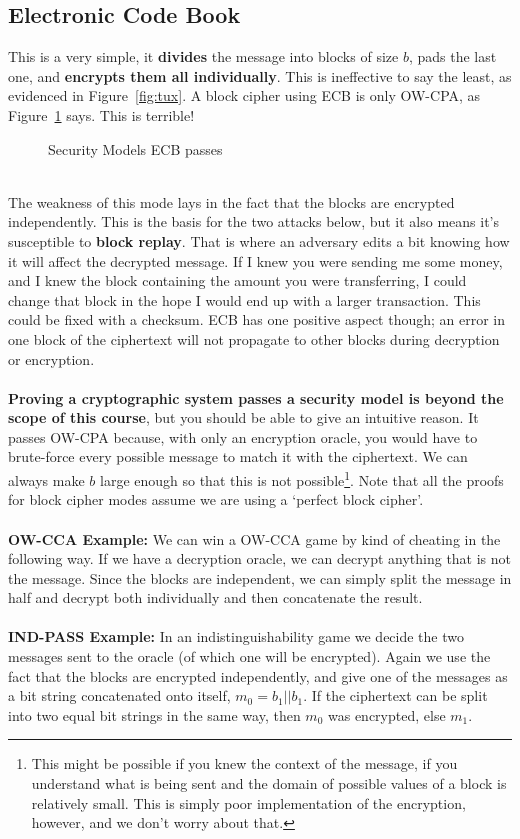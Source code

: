     \subsection{Electronic Code Book}
    This is a very simple, it \textbf{divides} the message into blocks of size $b$, pads the last one, and \textbf{encrypts them all individually}. This is ineffective to say the least, as evidenced in Figure~\ref{fig:tux}. A block cipher using ECB is only OW-CPA, as Figure~\ref{fig:ecb-attacktable} says. 
    This is terrible!\\
    \begin{figure}[htp!]
    \centering
    \caption{Security Models ECB passes}
    \label{fig:ecb-attacktable}
    \end{figure}
    \\
    The weakness of this mode lays in the fact that the blocks are encrypted independently. This is the basis for the two attacks below, but it also means it's susceptible to \textbf{block replay}. That is where an adversary edits a bit knowing how it will affect the decrypted message. If I knew you were sending me some money, and I knew the block containing the amount you were transferring, I could change that block in the hope I would end up with a larger transaction. This could be fixed with a checksum. ECB has one positive aspect though; an error in one block of the ciphertext will not propagate to other blocks during decryption or encryption.\\
    \\
    \textbf{Proving a cryptographic system passes a security model is beyond the scope of this course}, but you should be able to give an intuitive reason. It passes OW-CPA because, with only an encryption oracle, you would have to brute-force every possible message to match it with the ciphertext. We can always make $b$ large enough so that this is not possible\footnote{This might be possible if you knew the context of the message, if you understand what is being sent and the domain of possible values of a block is relatively small. This is simply poor implementation of the encryption, however, and we don't worry about that.}. Note that all the proofs for block cipher modes assume we are using a `perfect block cipher'.\\
    \\
    \textbf{OW-CCA Example:} We can win a OW-CCA game by kind of cheating in the following way. If we have a decryption oracle, we can decrypt anything that is not the message. Since the blocks are independent, we can simply split the message in half and decrypt both individually and then concatenate the result.\\
    \\
    \textbf{IND-PASS Example:} In an indistinguishability game we decide the two messages sent to the oracle (of which one will be encrypted). Again we use the fact that the blocks are encrypted independently, and give one of the messages as a bit string concatenated onto itself, $m_0=b_1||b_1$. If the ciphertext can be split into two equal bit strings in the same way, then $m_0$ was encrypted, else $m_1$.
    
